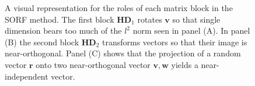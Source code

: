\begin{figure}[h]
{\begin{adjustbox}{width=0.29\textwidth}
        \end{adjustbox}
    }
    \caption{A visual representation for the roles of each matrix block in the SORF method. The first block $\bm{H} \bm{D}_1$ rotates $\bm{v}$ so that single dimension bears too much of the $l^2$ norm seen in panel (A). In panel (B) the second block $\bm{H} \bm{D}_2$ transforms vectors so that their image is near-orthogonal. Panel (C) shows that the projection of a random vector $\bm{r}$ onto two near-orthogonal vector $\bm{v},\bm{w}$ yields a near-independent vector.}
    \label{fig: SORF-vis}
\end{figure}
